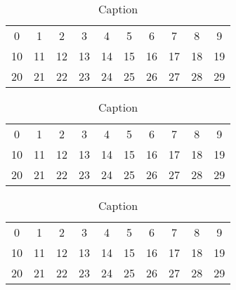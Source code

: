 \documentclass[12pt, a4paper, titlepage,twoside]{article}
\begin{document}
\begin{table}[!ht]
	 		\vspace{8mm}
	  		\begin{tabular}{|c|c|c|c|c|c|c|c|c|c|}
		 			\hline	 		 			
		 		\cellcolor{red}0  & \cellcolor{red} 1 &  2 &  3 & \cellcolor{red}4 &  5 & \cellcolor{red} 6 &  7 & \cellcolor{red} 8 &  \cellcolor{red}9 \\
	 		 	\cellcolor{red}10 & 11 & \cellcolor{red}12 & 13 & \cellcolor{red}14 & \cellcolor{red}15 & \cellcolor{red}16 & 17 & \cellcolor{red}18 & 19 \\
	 		 	\cellcolor{red}20 & \cellcolor{red}21 & \cellcolor{red}22 & 23 & \cellcolor{red}24 & 25 & \cellcolor{red}26 & \cellcolor{red}27 & \cellcolor{red}28 & 29 \\
	 		 	\hline
	 		\end{tabular}
	 		
			\vspace{8mm}
			\begin{tabular}{|c|c|c|c|c|c|c|c|c|c|}
				\hline	 		 			
				\cellcolor{red}0  & \cellcolor{red} 1 &  2 &  3 & \cellcolor{red}4 &  5 & \cellcolor{red} 6 &  7 & \cellcolor{red} 8 &  \cellcolor{red}9 \\
				\cellcolor{red}10 & 11 & \cellcolor{red}12 & 13 & \cellcolor{red}14 & \cellcolor{red}15 & \cellcolor{red}16 & 17 & \cellcolor{red}18 & 19 \\
				\cellcolor{red}20 & \cellcolor{red}21 & \cellcolor{red}22 & 23 & \cellcolor{red}24 & \cellcolor{red}25 & \cellcolor{red}26 & \cellcolor{red}27 & \cellcolor{red}28 & 29 \\
				\hline
			\end{tabular}
			
			\vspace{8mm}
			\begin{tabular}{|c|c|c|c|c|c|c|c|c|c|}
				\hline	 		 			
				\cellcolor{red}0  & \cellcolor{red} 1 &  \cellcolor{green}2 &  \cellcolor{green}3 & \cellcolor{red}4 &  \cellcolor{green}5 & \cellcolor{red} 6 &  \cellcolor{green}7 & \cellcolor{red} 8 &  \cellcolor{red}9 \\
				\cellcolor{red}10 & \cellcolor{green}11 & \cellcolor{red}12 & \cellcolor{green}13 & \cellcolor{red}14 & \cellcolor{red}15 & \cellcolor{red}16 & \cellcolor{green}17 & \cellcolor{red}18 & \cellcolor{green}19 \\
				\cellcolor{red}20 & \cellcolor{red}21 & \cellcolor{red}22 & \cellcolor{green}23 & \cellcolor{red}24 & \cellcolor{red}25 & \cellcolor{red}26 & \cellcolor{red}27 & \cellcolor{red}28 & \cellcolor{green}29 \\
				\hline
			\end{tabular}
	 	
	 	\caption{Caption}
	 	\label{tab:ueberlaufzeiten}
	 \end{table} 
\end{document}
